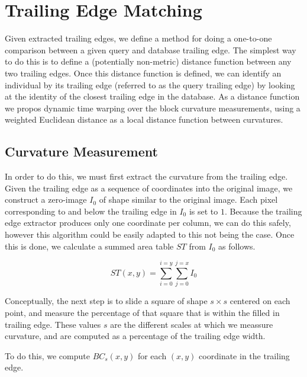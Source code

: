 \section{Trailing Edge Matching}

Given extracted trailing edges, we define a method for doing a one-to-one comparison between a given query and database trailing edge.
The simplest way to do this is to define a (potentially non-metric) distance function between any two trailing edges.
Once this distance function is defined, we can identify an individual by its trailing edge (referred to as the query trailing edge) by looking at the identity of the closest trailing edge in the database.
As a distance function we propos dynamic time warping over the block curvature measurements, using a weighted Euclidean distance as a local distance function between curvatures.

\subsection{Curvature Measurement}

In order to do this, we must first extract the curvature from the trailing edge.
Given the trailing edge as a sequence of coordinates into the original image, we construct a zero-image $I_0$ of shape similar to the original image.
Each pixel corresponding to and below the trailing edge in $I_0$ is set to $1$.
Because the trailing edge extractor produces only one coordinate per column, we can do this safely, however this algorithm could be easily adapted to this not being the case.
Once this is done, we calculate a summed area table \cite{crow1984summed} $ST$ from $I_0$ as follows.

\begin{equation}
ST(x,y) = \sum_{i=0}^{i=y}\sum_{j=0}^{j=x} I_0 
\end{equation}

Conceptually, the next step is to slide a square of shape $s \times s$ centered on each point, and measure the percentage of that square that is within the filled in trailing edge.
These values $s$ are the different scales at which we meassure curvature, and are computed as a percentage of the trailing edge width.

To do this, we compute $BC_s(x, y)$ for each $(x, y)$ coordinate in the trailing edge.

